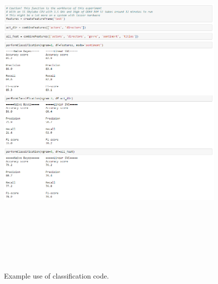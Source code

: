 \documentclass[
10pt, %
a4paper, %
oneside, %
headinclude,footinclude, %
] {book}%
\begin{document}
\begin{figure}[hbtp]\centering
\includegraphics[width=6in, height=7in]{example_clf} 
\caption{Example use of classification code.\label{Figure 5}}
\end{figure}
\end{document}

